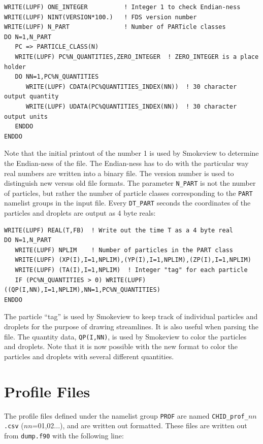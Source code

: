 \documentclass[11pt]{book}
\newcommand{\ct}{\tt\small}
\begin{document}
\footnotesize
\begin{verbatim}
WRITE(LUPF) ONE_INTEGER          ! Integer 1 to check Endian-ness
WRITE(LUPF) NINT(VERSION*100.)   ! FDS version number
WRITE(LUPF) N_PART               ! Number of PARTicle classes
DO N=1,N_PART
   PC => PARTICLE_CLASS(N)
   WRITE(LUPF) PC%N_QUANTITIES,ZERO_INTEGER  ! ZERO_INTEGER is a place holder
   DO NN=1,PC%N_QUANTITIES
      WRITE(LUPF) CDATA(PC%QUANTITIES_INDEX(NN))  ! 30 character output quantity
      WRITE(LUPF) UDATA(PC%QUANTITIES_INDEX(NN))  ! 30 character output units
   ENDDO
ENDDO
\end{verbatim}
\normalsize
Note that the initial printout of the number 1 is used by Smokeview to determine the
Endian-ness of the file. The Endian-ness has to do with the particular way real numbers are written into a binary file.
The version number is used to distinguish new versus old file formats.
The parameter {\ct N\_PART} is not the number of particles, but rather the number of
particle classes corresponding to the {\ct PART} namelist groups in the input file.
Every {\ct DT\_PART} seconds the coordinates of the particles and droplets are output as 4 byte reals:

\footnotesize
\begin{verbatim}
WRITE(LUPF) REAL(T,FB)  ! Write out the time T as a 4 byte real
DO N=1,N_PART
   WRITE(LUPF) NPLIM    ! Number of particles in the PART class
   WRITE(LUPF) (XP(I),I=1,NPLIM),(YP(I),I=1,NPLIM),(ZP(I),I=1,NPLIM)
   WRITE(LUPF) (TA(I),I=1,NPLIM)  ! Integer "tag" for each particle
   IF (PC%N_QUANTITIES > 0) WRITE(LUPF) ((QP(I,NN),I=1,NPLIM),NN=1,PC%N_QUANTITIES)
ENDDO
\end{verbatim}
\normalsize
The particle ``tag'' is used by Smokeview to keep track of individual particles and droplets for the purpose of drawing
streamlines. It is also useful when parsing the file. The quantity data, {\ct QP(I,NN)}, is used by Smokeview to color
the particles and droplets. Note that it is now possible with the new format to color the particles and droplets with
several different quantities.

\section{Profile Files}
\label{out:PROF}

The profile files defined under the namelist group {\ct PROF} are
named {\ct CHID\_prof\_$nn$.csv} ($nn$=01,02...),
and are written out formatted. These files are written out from {\ct dump.f90} with the following line:
\end{document}
